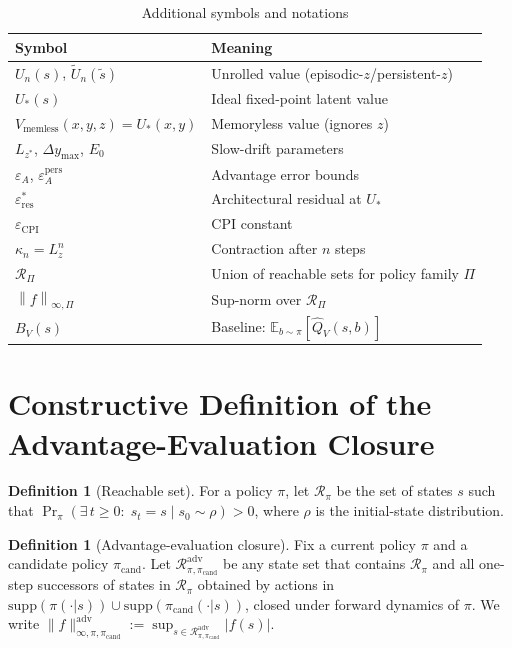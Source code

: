 \documentclass{article}
\theoremstyle{plain}
\theoremstyle{definition}
\newtheorem{definition}[theorem]{Definition}
\theoremstyle{remark}
\newcommand{\shortonly}[1]{#1}
\newcommand{\shortonly}[1]{}
\newcommand{\E}{\mathbb{E}}
\newcommand{\supnorm}[2]{\left\| #1 \right\|_{\infty,#2}}
\begin{document}
\begin{table}[t]
\caption{Additional symbols and notations}
\label{tab:notation}
\begin{center}
\begin{tabular}{ll}
\toprule
Symbol & Meaning \\
\midrule
$U_n(s)$, $\tilde U_n(\tilde s)$ & Unrolled value (episodic-$z$/persistent-$z$) \\
$U_*(s)$ & Ideal fixed-point latent value \\
$V_{\mathrm{memless}}(x,y,z) = U_*(x,y)$ & Memoryless value (ignores $z$) \\
$L_{z^*}$, $\Delta y_{\max}$, $E_0$ & Slow-drift parameters \\
$\varepsilon_A$, $\varepsilon_A^{\mathrm{pers}}$ & Advantage error bounds \\
$\varepsilon_{\mathrm{res}}^*$ & Architectural residual at $U_*$ \\
$\varepsilon_{\mathrm{CPI}}$ & CPI constant \\
$\kappa_n = L_z^n$ & Contraction after $n$ steps \\
$\mathcal{R}_\Pi$ & Union of reachable sets for policy family $\Pi$ \\
$\supnorm{f}{\Pi}$ & Sup-norm over $\mathcal{R}_\Pi$ \\
$B_V(s)$ & Baseline: $\E_{b \sim \pi}[\widehat{Q}_V(s,b)]$ \\
\bottomrule
\end{tabular}
\end{center}
\end{table}

\section{Constructive Definition of the Advantage-Evaluation Closure}
\label{app:adv_closure_full}

\shortonly{
\begin{definition}[Reachable set]
\label{def:reachable}
For a policy $\pi$, let $\mathcal{R}_\pi$ be the set of states $s$ such that
$\Pr_\pi(\exists\, t\ge 0:\; s_t=s \mid s_0\sim\rho)>0$, where $\rho$ is the initial-state distribution.
\end{definition}

\begin{definition}[Advantage-evaluation closure]
\label{def:adv_closure}
Fix a current policy $\pi$ and a candidate policy $\pi_{\mathrm{cand}}$.
Let $\mathcal{R}_{\pi,\pi_{\mathrm{cand}}}^{\mathrm{adv}}$ be any state set that contains $\mathcal{R}_\pi$ and all one-step successors of states in $\mathcal{R}_\pi$ obtained by actions in $\mathrm{supp}(\pi(\cdot|s))\cup\mathrm{supp}(\pi_{\mathrm{cand}}(\cdot|s))$, closed under forward dynamics of $\pi$.
We write $\|f\|_{\infty,\pi,\pi_{\mathrm{cand}}}^{\mathrm{adv}} := \sup_{s\in \mathcal{R}_{\pi,\pi_{\mathrm{cand}}}^{\mathrm{adv}}} |f(s)|$.
\end{definition}
}
\end{document}

